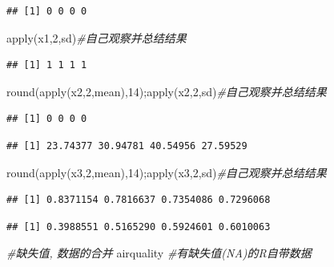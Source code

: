 \documentclass[
]{book}
\newenvironment{Shaded}{\begin{snugshade}}{\end{snugshade}}
\newcommand{\CommentTok}[1]{\textcolor[rgb]{0.56,0.35,0.01}{\textit{#1}}}
\newcommand{\DecValTok}[1]{\textcolor[rgb]{0.00,0.00,0.81}{#1}}
\newcommand{\FunctionTok}[1]{\textcolor[rgb]{0.00,0.00,0.00}{#1}}
\newcommand{\NormalTok}[1]{#1}
\begin{document}
\begin{verbatim}
## [1] 0 0 0 0
\end{verbatim}

\begin{Shaded}
\begin{Highlighting}[]
\FunctionTok{apply}\NormalTok{(x1,}\DecValTok{2}\NormalTok{,sd)}\CommentTok{\#自己观察并总结结果}
\end{Highlighting}
\end{Shaded}

\begin{verbatim}
## [1] 1 1 1 1
\end{verbatim}

\begin{Shaded}
\begin{Highlighting}[]
\FunctionTok{round}\NormalTok{(}\FunctionTok{apply}\NormalTok{(x2,}\DecValTok{2}\NormalTok{,mean),}\DecValTok{14}\NormalTok{);}\FunctionTok{apply}\NormalTok{(x2,}\DecValTok{2}\NormalTok{,sd)}\CommentTok{\#自己观察并总结结果}
\end{Highlighting}
\end{Shaded}

\begin{verbatim}
## [1] 0 0 0 0
\end{verbatim}

\begin{verbatim}
## [1] 23.74377 30.94781 40.54956 27.59529
\end{verbatim}

\begin{Shaded}
\begin{Highlighting}[]
\FunctionTok{round}\NormalTok{(}\FunctionTok{apply}\NormalTok{(x3,}\DecValTok{2}\NormalTok{,mean),}\DecValTok{14}\NormalTok{);}\FunctionTok{apply}\NormalTok{(x3,}\DecValTok{2}\NormalTok{,sd)}\CommentTok{\#自己观察并总结结果}
\end{Highlighting}
\end{Shaded}

\begin{verbatim}
## [1] 0.8371154 0.7816637 0.7354086 0.7296068
\end{verbatim}

\begin{verbatim}
## [1] 0.3988551 0.5165290 0.5924601 0.6010063
\end{verbatim}

\begin{Shaded}
\begin{Highlighting}[]
\CommentTok{\#缺失值, 数据的合并}
\NormalTok{airquality }\CommentTok{\#有缺失值(NA)的R自带数据}
\end{Highlighting}
\end{Shaded}
\end{document}
